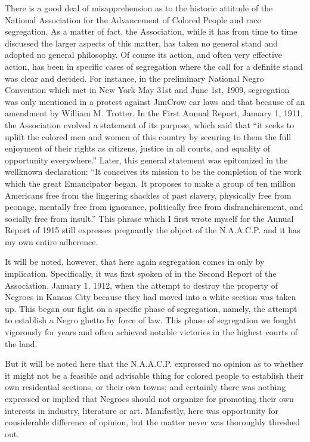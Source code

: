 \documentclass[letterpaper,10pt,english]{jupyterBook}
\begin{document}
\sphinxAtStartPar
There is a good deal of misapprehension as to the historic attitude of the National Association for the Advancement of Colored People and race segregation. As a matter of fact, the Association, while it has from time to time discussed the larger aspects of this matter, has taken no general stand and adopted no general philosophy. Of course its action, and often very effective action, has been in specific cases of segregation where the call for a definite stand was clear and decided. For instance, in the preliminary National Negro Convention which met in New York May 31st and June 1st, 1909, segregation was only mentioned in a protest against Jim\sphinxhyphen{}Crow car laws and that because of an amendment by William M. Trotter. In the First Annual Report, January 1, 1911, the Association evolved a statement of its purpose, which said that “it seeks to uplift the colored men and women of this country by securing to them the full enjoyment of their rights as citizens, justice in all courts, and equality of opportunity everywhere.” Later, this general statement was epitomized in the well\sphinxhyphen{}known declaration: “It conceives its mission to be the completion of the work which the great Emancipator began. It proposes to make a group of ten million Americans free from the lingering shackles of past slavery, physically free from peonage, mentally free from ignorance, politically free from disfranchisement, and socially free from insult.” This phrase which I first wrote myself for the Annual Report of 1915 still expresses pregnantly the object of the N.A.A.C.P. and it has my own entire adherence.

\sphinxAtStartPar
It will be noted, however, that here again segregation comes in only by implication. Specifically, it was first spoken of in the Second Report of the Association, January 1, 1912, when the attempt to destroy the property of Negroes in Kansas City because they had moved into a white section was taken up. This began our fight on a specific phase of segregation, namely, the attempt to establish a Negro ghetto by force of law. This phase of segregation we fought vigorously for years and often achieved notable victories in the highest courts of the land.

\sphinxAtStartPar
But it will be noted here that the N.A.A.C.P. expressed no opinion as to whether it might not be a feasible and advisable thing for colored people to establish their own residential sections, or their own towns; and certainly there was nothing expressed or implied that Negroes should not organize for promoting their own interests in industry, literature or art. Manifestly, here was opportunity for considerable difference of opinion, but the matter never was thoroughly threshed out.
\end{document}
